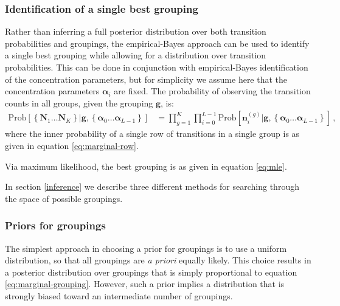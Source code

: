 \documentclass[12pt]{article}
\newcommand{\bg}{\mathbf{g}}
\newcommand{\balpha}{\boldsymbol{\alpha}}
\newcommand{\bN}{\mathbf{N}}
\newcommand{\bn}{\mathbf{n}}
\newcommand{\Prob}{\mathrm{Prob}}
\begin{document}
\subsubsection{Identification of a single best grouping}
\label{one-grouping}

Rather than inferring a full posterior distribution over both transition probabilities and groupings, the empirical-Bayes approach can be used to identify a single best grouping while allowing for a distribution over transition probabilities. This can be done in conjunction with empirical-Bayes identification of the concentration parameters, but for simplicity we assume here that the concentration parameters $\balpha_i$ are fixed. The probability of observing the transition counts in all groups, given the grouping $\bg$, is:
\begin{align}
	\label{eq:marginal-grouping}
	\Prob
	\left[
		\left\{ \bN_1 \ldots \bN_K \right\} | \bg,
			\left\{ \balpha_0 \ldots \balpha_{L-1} \right\}
	\right]
	&=
	\prod_{g=1}^{K} \prod_{i=0}^{L-1}
	\Prob \left[ \bn_i^{(g)} | \bg, \left\{ \balpha_0 \ldots \balpha_{L-1} \right\} \right]
	\, ,
\end{align}
where the inner probability of a single row of transitions in a single group is as given in equation \eqref{eq:marginal-row}.

Via maximum likelihood, the best grouping is as given in equation \eqref{eq:mle}.

In section \ref{inference} we describe three different methods for searching through the space of possible groupings.

\subsubsection{Priors for groupings}
\label{model-group-priors}

The simplest approach in choosing a prior for groupings is to use a uniform distribution, so that all groupings are \emph{a priori} equally likely. This choice results in a posterior distribution over groupings that is simply proportional to equation \eqref{eq:marginal-grouping}. However, such a prior implies a distribution that is strongly biased toward an intermediate number of groupings.
\end{document}
